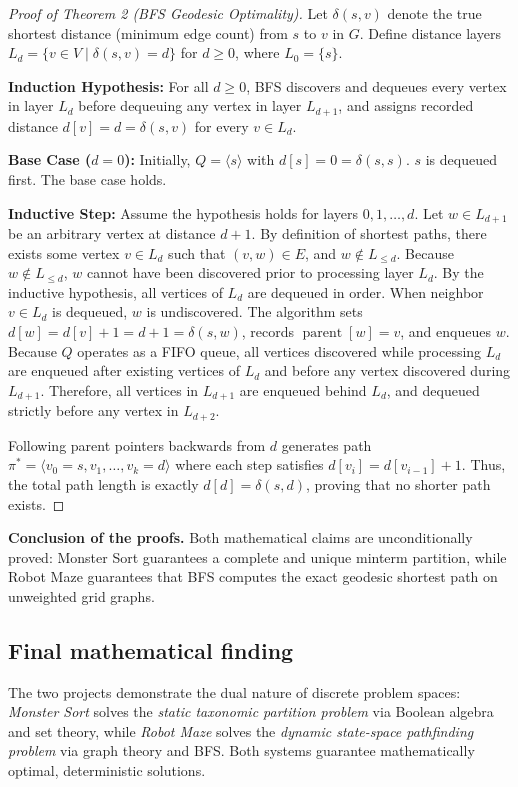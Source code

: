 \documentclass[11pt,a4paper]{article}
\begin{document}
\begin{proof}[Proof of Theorem 2 (BFS Geodesic Optimality)]
Let $\delta(s, v)$ denote the true shortest distance (minimum edge count) from $s$ to $v$ in $G$. Define distance layers $L_d = \{v \in V \mid \delta(s, v) = d\}$ for $d \ge 0$, where $L_0 = \{s\}$.

\textbf{Induction Hypothesis:} For all $d \ge 0$, BFS discovers and dequeues every vertex in layer $L_d$ before dequeuing any vertex in layer $L_{d+1}$, and assigns recorded distance $d[v] = d = \delta(s, v)$ for every $v \in L_d$.

\textbf{Base Case ($d=0$):} Initially, $Q = \langle s \rangle$ with $d[s] = 0 = \delta(s, s)$. $s$ is dequeued first. The base case holds.

\textbf{Inductive Step:} Assume the hypothesis holds for layers $0, 1, \dots, d$.
Let $w \in L_{d+1}$ be an arbitrary vertex at distance $d+1$. By definition of shortest paths, there exists some vertex $v \in L_d$ such that $(v, w) \in E$, and $w \notin L_{\le d}$.
Because $w \notin L_{\le d}$, $w$ cannot have been discovered prior to processing layer $L_d$.
By the inductive hypothesis, all vertices of $L_d$ are dequeued in order. When neighbor $v \in L_d$ is dequeued, $w$ is undiscovered. The algorithm sets $d[w] = d[v] + 1 = d + 1 = \delta(s, w)$, records $\operatorname{parent}[w] = v$, and enqueues $w$.
Because $Q$ operates as a FIFO queue, all vertices discovered while processing $L_d$ are enqueued after existing vertices of $L_d$ and before any vertex discovered during $L_{d+1}$.
Therefore, all vertices in $L_{d+1}$ are enqueued behind $L_d$, and dequeued strictly before any vertex in $L_{d+2}$.

Following parent pointers backwards from $d$ generates path $\pi^* = \langle v_0 = s, v_1, \dots, v_k = d \rangle$ where each step satisfies $d[v_i] = d[v_{i-1}] + 1$. Thus, the total path length is exactly $d[d] = \delta(s, d)$, proving that no shorter path exists.
\end{proof}

\textbf{Conclusion of the proofs.}
Both mathematical claims are unconditionally proved: Monster Sort guarantees a complete and unique minterm partition, while Robot Maze guarantees that BFS computes the exact geodesic shortest path on unweighted grid graphs.

\subsection*{Final mathematical finding}
The two projects demonstrate the dual nature of discrete problem spaces: \textit{Monster Sort} solves the \textit{static taxonomic partition problem} via Boolean algebra and set theory, while \textit{Robot Maze} solves the \textit{dynamic state-space pathfinding problem} via graph theory and BFS. Both systems guarantee mathematically optimal, deterministic solutions.
\end{document}
